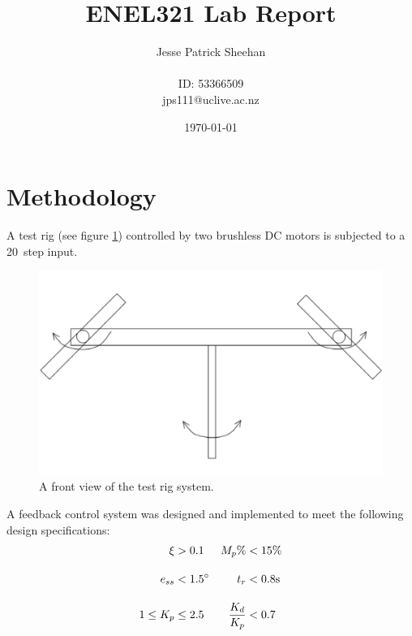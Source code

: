 \documentclass[12pt]{article} %
\title{ENEL321 Lab Report}
\date{\today}
\author{
	Jesse Patrick Sheehan\\
	\\
	{\small{ID: 53366509}}\\
	{\small{jps111@uclive.ac.nz}}\\
}
\begin{document}
\maketitle

\vfill

\renewcommand{\abstractname}{Executive Summary}

\begin{abstract}


\blindtext

\end{abstract}

\newpage

\section{Methodology}

A test rig (see figure \ref{fig:test-rig}) controlled by two brushless DC motors is subjected to a 20\degree\ step input.

\begin{figure}[H]
	\centering
	\includegraphics[scale=0.8]{test-rig}
	\caption{A front view of the test rig system.}
	\label{fig:test-rig}
\end{figure}

\noindent A feedback control system was designed and implemented to meet the following design specifications:
\begin{align*}
\xi &> 0.1 & M_p\% &< 15\%  \\[1em]
e_{ss} &< 1.5\degree & t_r &< 0.8 \textrm{s} \\[1em]
1 \leq K_p &\leq 2.5 & \frac{K_d}{K_p} &< 0.7
\end{align*}
\end{document}
